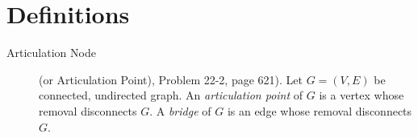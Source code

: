 \section{Definitions}

\begin{description}
	\item [Articulation Node] (or Articulation Point), Problem 22-2, page 621).  Let $G = (V,E)$ be  connected, undirected graph.  An {\it articulation point} of $G$ is a vertex whose removal disconnects $G$.  A {\it bridge} of $G$ is an edge whose removal disconnects $G$.  
\end{description}
	
